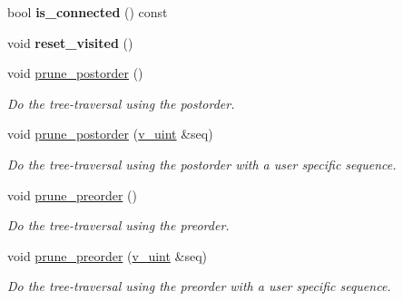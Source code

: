 \begin{DoxyCompactItemize}
\item 
bool {\bfseries is\+\_\+connected} () const \hypertarget{classpruner_1_1Tree_ad47fa64c50fa9931f4e98d4dc4b94272}{}\label{classpruner_1_1Tree_ad47fa64c50fa9931f4e98d4dc4b94272}

\item 
void {\bfseries reset\+\_\+visited} ()\hypertarget{classpruner_1_1Tree_a3ff712c25817e2bb3d1a87baef7b87d0}{}\label{classpruner_1_1Tree_a3ff712c25817e2bb3d1a87baef7b87d0}

\item 
void \hyperlink{classpruner_1_1Tree_a7d465880d18acf79f3a772ea5412b0d7}{prune\+\_\+postorder} ()
\begin{DoxyCompactList}\small\item\em Do the tree-\/traversal using the postorder. \end{DoxyCompactList}\item 
void \hyperlink{classpruner_1_1Tree_a8318027f3d2b1a07bf25e813c7c80056}{prune\+\_\+postorder} (\hyperlink{namespacepruner_af0145646bd7ede012cd336b416bc5579}{v\+\_\+uint} \&seq)
\begin{DoxyCompactList}\small\item\em Do the tree-\/traversal using the postorder with a user specific sequence. \end{DoxyCompactList}\item 
void \hyperlink{classpruner_1_1Tree_ac85bfb083b3856e65987e1d15885a61c}{prune\+\_\+preorder} ()
\begin{DoxyCompactList}\small\item\em Do the tree-\/traversal using the preorder. \end{DoxyCompactList}\item 
void \hyperlink{classpruner_1_1Tree_a6841109c7ff37bcabdf3a4d79009ad21}{prune\+\_\+preorder} (\hyperlink{namespacepruner_af0145646bd7ede012cd336b416bc5579}{v\+\_\+uint} \&seq)
\begin{DoxyCompactList}\small\item\em Do the tree-\/traversal using the preorder with a user specific sequence. \end{DoxyCompactList}\end{DoxyCompactItemize}
